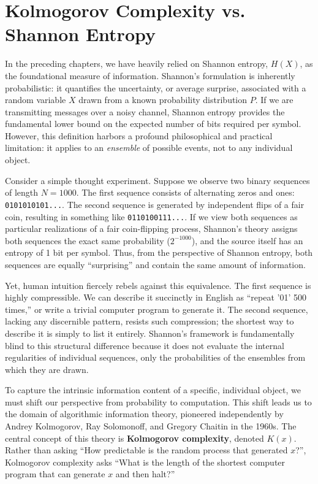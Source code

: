 \chapter{Kolmogorov Complexity vs. Shannon Entropy}
\label{ch:kolmogorov}

In the preceding chapters, we have heavily relied on Shannon entropy, $H(X)$, as the foundational measure of information. Shannon's formulation is inherently probabilistic: it quantifies the uncertainty, or average surprise, associated with a random variable $X$ drawn from a known probability distribution $P$. If we are transmitting messages over a noisy channel, Shannon entropy provides the fundamental lower bound on the expected number of bits required per symbol. However, this definition harbors a profound philosophical and practical limitation: it applies to an \textit{ensemble} of possible events, not to any individual object.

Consider a simple thought experiment. Suppose we observe two binary sequences of length $N = 1000$. The first sequence consists of alternating zeros and ones: \texttt{0101010101...}. The second sequence is generated by independent flips of a fair coin, resulting in something like \texttt{0110100111...}. If we view both sequences as particular realizations of a fair coin-flipping process, Shannon's theory assigns both sequences the exact same probability ($2^{-1000}$), and the source itself has an entropy of 1 bit per symbol. Thus, from the perspective of Shannon entropy, both sequences are equally ``surprising'' and contain the same amount of information. 

Yet, human intuition fiercely rebels against this equivalence. The first sequence is highly compressible. We can describe it succinctly in English as ``repeat '01' 500 times,'' or write a trivial computer program to generate it. The second sequence, lacking any discernible pattern, resists such compression; the shortest way to describe it is simply to list it entirely. Shannon's framework is fundamentally blind to this structural difference because it does not evaluate the internal regularities of individual sequences, only the probabilities of the ensembles from which they are drawn.

To capture the intrinsic information content of a specific, individual object, we must shift our perspective from probability to computation. This shift leads us to the domain of algorithmic information theory, pioneered independently by Andrey Kolmogorov, Ray Solomonoff, and Gregory Chaitin in the 1960s. The central concept of this theory is \textbf{Kolmogorov complexity}, denoted $K(x)$. Rather than asking ``How predictable is the random process that generated $x$?'', Kolmogorov complexity asks ``What is the length of the shortest computer program that can generate $x$ and then halt?''

